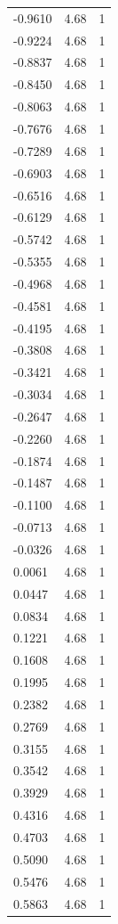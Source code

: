 \begin{longtable}{lrr}
  -0.9610 & 4.68 & 1 \\
  -0.9224 & 4.68 & 1 \\
  -0.8837 & 4.68 & 1 \\
  -0.8450 & 4.68 & 1 \\
  -0.8063 & 4.68 & 1 \\
  -0.7676 & 4.68 & 1 \\
  -0.7289 & 4.68 & 1 \\
  -0.6903 & 4.68 & 1 \\
  -0.6516 & 4.68 & 1 \\
  -0.6129 & 4.68 & 1 \\
  -0.5742 & 4.68 & 1 \\
  -0.5355 & 4.68 & 1 \\
  -0.4968 & 4.68 & 1 \\
  -0.4581 & 4.68 & 1 \\
  -0.4195 & 4.68 & 1 \\
  -0.3808 & 4.68 & 1 \\
  -0.3421 & 4.68 & 1 \\
  -0.3034 & 4.68 & 1 \\
  -0.2647 & 4.68 & 1 \\
  -0.2260 & 4.68 & 1 \\
  -0.1874 & 4.68 & 1 \\
  -0.1487 & 4.68 & 1 \\
  -0.1100 & 4.68 & 1 \\
  -0.0713 & 4.68 & 1 \\
  -0.0326 & 4.68 & 1 \\
  0.0061 & 4.68 & 1 \\
  0.0447 & 4.68 & 1 \\
  0.0834 & 4.68 & 1 \\
  0.1221 & 4.68 & 1 \\
  0.1608 & 4.68 & 1 \\
  0.1995 & 4.68 & 1 \\
  0.2382 & 4.68 & 1 \\
  0.2769 & 4.68 & 1 \\
  0.3155 & 4.68 & 1 \\
  0.3542 & 4.68 & 1 \\
  0.3929 & 4.68 & 1 \\
  0.4316 & 4.68 & 1 \\
  0.4703 & 4.68 & 1 \\
  0.5090 & 4.68 & 1 \\
  0.5476 & 4.68 & 1 \\
  0.5863 & 4.68 & 1 \\

\end{longtable}
